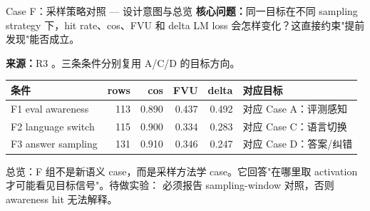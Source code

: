 
\footnotesize

\begin{frame}{Case F：采样策略对照 — 设计意图与总览}
\scriptsize
\textbf{核心问题：}同一目标在不同 sampling strategy 下，hit rate、cos、FVU 和 delta LM loss 会怎样变化？这直接约束"提前发现"能否成立。

\textbf{来源：}R3 。三条条件分别复用 A/C/D 的目标方向。

\vspace{0.25em}
\begin{tabularx}{\linewidth}{lrrrrX}
\toprule
条件 & rows & cos & FVU & delta & 对应目标 \\
\midrule
F1 eval awareness & 113 & 0.890 & 0.437 & 0.492 & 对应 Case A：评测感知 \\
F2 language switch & 115 & 0.900 & 0.334 & 0.283 & 对应 Case C：语言切换 \\
F3 answer sampling & 131 & 0.910 & 0.346 & 0.247 & 对应 Case D：答案/纠错 \\
\bottomrule
\end{tabularx}

\vspace{0.3em}
\alert{总览：}F 组不是新语义 case，而是采样方法学 case。它回答"在哪里取 activation 才可能看见目标信号"。待做实验： 必须报告 sampling-window 对照，否则 awareness hit 无法解释。
\end{frame}

